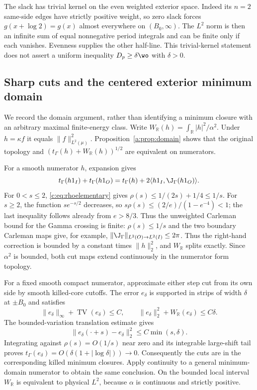 \documentclass[11pt,a4paper]{article}
\numberwithin{equation}{section}
\theoremstyle{definition}\newtheorem{definition}[theorem]{Definition}
\theoremstyle{remark}\newtheorem{remark}[theorem]{Remark}
\newcommand{\R}{\mathbb R}\newcommand{\C}{\mathbb C}\newcommand{\N}{\mathbb N}
\newcommand{\ip}[2]{\langle#1,#2\rangle}\newcommand{\norm}[1]{\lVert#1\rVert}\newcommand{\abs}[1]{\lvert#1\rvert}
\begin{document}
The slack has trivial kernel on the even weighted exterior space.
Indeed its $n=2$ same-side edges have strictly positive weight, so
zero slack forces $g(x+\log2)=g(x)$ almost everywhere on $({B_0},\infty)$.
The $L^2$ norm is then an infinite sum of equal nonnegative period
integrals and can be finite only if each vanishes. Evenness supplies
the other half-line. This trivial-kernel statement does not assert a
uniform inequality $D_p\ge\delta\wo$ with $\delta>0$.


\subsection{Sharp cuts and the centered exterior minimum domain}\label{c:app:cuts}
We record the domain argument, rather than identifying a minimum
closure with an arbitrary maximal finite-energy class.
Write $W_\R(h)=\int_\R |h|^2/\alpha^2$. Under $h=\kappa f$ it equals
$\norm f_{L^2(\mu)}^2$. Proposition~\ref{a:prop:domain}
shows that the original topology and
$(t_\Gamma(h)+W_\R(h))^{1/2}$ are equivalent on numerators.

For a smooth numerator $h$, expansion gives
\[
 t_\Gamma(h1_I)+t_\Gamma(h1_O)
 =t_\Gamma(h)+2\ip{h1_I}{\J_\Gamma(h1_O)}.
\]
For $0<s\le2$, \eqref{c:eq:rhoelementary} gives
$\rho(s)\le1/(2s)+1/4\le1/s$. For $s\ge2$, the function
$se^{-s/2}$ decreases, so
$s\rho(s)\le(2/e)/(1-e^{-4})<1$; the last inequality follows already
from $e>8/3$. Thus the unweighted Carleman bound for the Gamma crossing
is finite: $\rho(s)\le1/s$ and the two boundary Carleman maps give,
for example, $\norm{\J_\Gamma}_{L^2(O)\to L^2(I)}\le2\pi$.
Thus the right-hand correction is bounded by a constant times
$\norm h_2^2$, and $W_\R$ splits exactly. Since $\alpha^2$ is bounded,
both cut maps extend continuously in the numerator form topology.

For a fixed smooth compact numerator, approximate either step cut from
its own side by smooth killed-core cutoffs. The error $e_\delta$ is
supported in strips of width $\delta$ at $\pm {B_0}$ and satisfies
\[
 \norm{e_\delta}_\infty+\operatorname{TV}(e_\delta)\le C,
 \qquad\norm{e_\delta}_2^2+W_\R(e_\delta)\le C\delta.
\]
The bounded-variation translation estimate gives
\[
 \norm{e_\delta(\cdot+s)-e_\delta}_2^2\le C\min(s,\delta).
\]
Integrating against $\rho(s)=O(1/s)$ near zero and its integrable
large-shift tail proves
$t_\Gamma(e_\delta)=O(\delta(1+|\log\delta|))\to0$.
Consequently the cuts are in the corresponding killed minimum closures.
Apply continuity to a general minimum-domain numerator to obtain the
same conclusion. On the bounded local interval $W_\R$ is equivalent
to physical $L^2$, because $\alpha$ is continuous and strictly positive.
\end{document}
